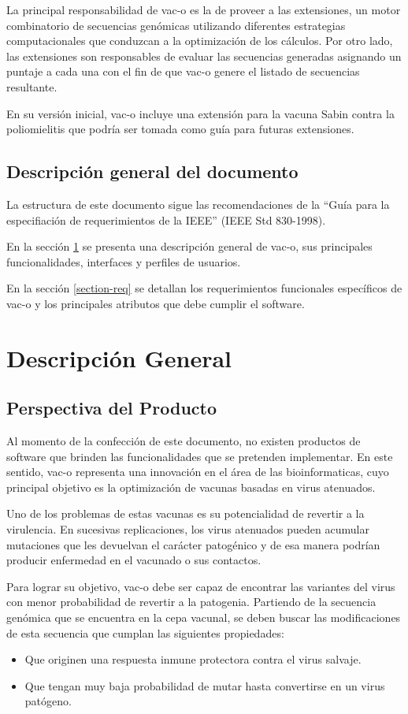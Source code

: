 \documentclass[10pt,a4paper]{article}
\begin{document}
  La principal responsabilidad de vac-o es la de proveer a las extensiones, un motor combinatorio de secuencias gen\'omicas utilizando diferentes estrategias computacionales que conduzcan a la optimizaci\'on de los c\'alculos. Por otro lado, las extensiones son responsables de evaluar las secuencias generadas asignando un puntaje a cada una con el fin de que vac-o genere el listado de secuencias resultante.

  En su versi\'on inicial, vac-o incluye una extensi\'on para la vacuna Sabin contra la poliomielitis que podr\'ia ser tomada como gu\'ia para futuras extensiones.

  \subsection{Descripci\'on general del documento}
  La estructura de este documento sigue las recomendaciones de la ``Gu\'ia para la especifiaci\'on de requerimientos de la IEEE'' (IEEE Std 830-1998).

  En la secci\'on \ref{section-desc-gral} se presenta una descripci\'on general de vac-o, sus principales funcionalidades, interfaces y perfiles de usuarios.
  
  En la secci\'on \ref{section-req} se detallan los requerimientos funcionales espec\'ificos de vac-o y los principales atributos que debe cumplir el software.

\section{Descripci\'on General}
  \label{section-desc-gral}
  \subsection{Perspectiva del Producto}   
    Al momento de la confecci\'on de este documento, no existen productos de software que brinden las funcionalidades que se pretenden implementar. En este sentido, vac-o representa una innovaci\'on en el \'area de las bioinformaticas, cuyo principal objetivo es la optimizaci\'on de vacunas basadas en virus atenuados.
    
    Uno de los problemas de estas vacunas es su potencialidad de revertir a la virulencia. En sucesivas replicaciones, los virus atenuados pueden acumular mutaciones que les devuelvan el car\'acter patog\'enico y de esa manera podr\'ian producir enfermedad en el vacunado o sus contactos.
    
    Para lograr su objetivo, vac-o debe ser capaz de encontrar las variantes del virus con menor probabilidad de revertir a la patogenia. Partiendo de la secuencia gen\'omica que se encuentra en la cepa vacunal, se deben buscar las modificaciones de esta secuencia que cumplan las siguientes propiedades:
    \begin{itemize}
      \item Que originen una respuesta inmune protectora contra el virus salvaje.
      \item Que tengan muy baja probabilidad de mutar hasta convertirse en un virus pat\'ogeno.
    \end{itemize}
    
\end{document}
